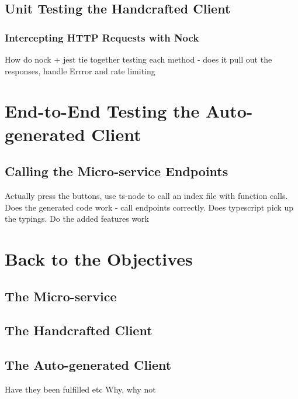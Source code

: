 \subsection{Unit Testing the Handcrafted Client}
\subsubsection{Intercepting HTTP Requests with Nock}
How do nock + jest tie together
testing each method - does it pull out the responses, handle Errror and rate limiting
\section{End-to-End Testing the Auto-generated Client}
\subsection{Calling the Micro-service Endpoints}
Actually press the buttons, use ts-node to call an index file with function calls. 
Does the generated code work - call endpoints correctly. Does typescript pick up the typings. Do the added features work
\section{Back to the Objectives}
\subsection{The Micro-service}
\subsection{The Handcrafted Client}
\subsection{The Auto-generated Client}
Have they been fulfilled etc
Why, why not